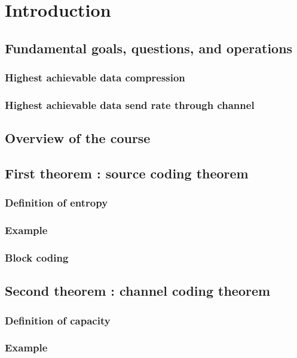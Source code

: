 \documentclass[a4paper, 12pt]{book}
\author{Sami \textsc{Abdul Sater}}
\begin{document}



\tableofcontents
\chapter{Introduction}
\section{Fundamental goals, questions, and operations}
\subsection{Highest achievable data compression}
\subsection{Highest achievable data send rate through channel}
\section{Overview of the course}

\section{First theorem : source coding theorem}
\subsection{Definition of entropy}
\subsection{Example}
\subsection{Block coding}

\section{Second theorem : channel coding theorem}
\subsection{Definition of capacity}
\subsection{Example}
\end{document}

